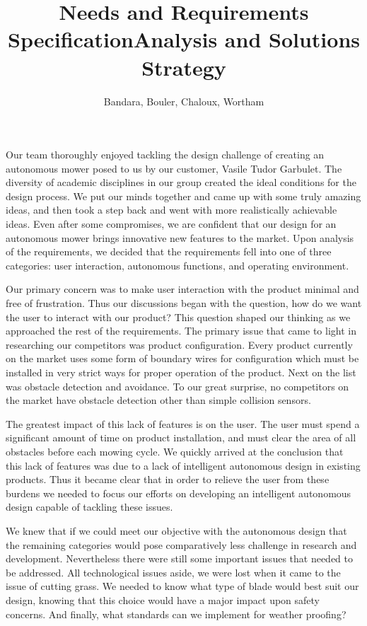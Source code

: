 \documentclass[12pt,letterpaper]{article}
\author{Bandara, Bouler, Chaloux, Wortham}
\title{Needs and Requirements Specification}
\title{Analysis and Solutions Strategy}
\begin{document}
\reqstitlepage
{}
\setcounter{page}{1}

Our team thoroughly enjoyed tackling the design challenge of creating an autonomous mower posed to us by our customer, Vasile Tudor Garbulet. The diversity of academic disciplines in our group created the ideal conditions for the design process.  We put our minds together and came up with some truly amazing ideas, and then took a step back and went with more realistically achievable ideas.  Even after some compromises, we are confident that our design for an autonomous mower brings innovative new features to the market.  Upon analysis of the requirements, we decided that the requirements fell into one of three categories:  user interaction, autonomous functions, and operating environment.

Our primary concern was to make user interaction with the product minimal and free of frustration.  Thus our discussions began with the question, how do we want the user to interact with our product?  This question shaped our thinking as we approached the rest of the requirements.  The primary issue that came to light in researching our competitors was product configuration.  Every product currently on the market uses some form of boundary wires for configuration which must be installed in very strict ways for proper operation of the product.  Next on the list was obstacle detection and avoidance.  To our great surprise, no competitors on the market have obstacle detection other than simple collision sensors.  

The greatest impact of this lack of features is on the user.  The user must spend a significant amount of time on product installation, and must clear the area of all obstacles before each mowing cycle.  We quickly arrived at the conclusion that this lack of features was due to a lack of intelligent autonomous design in existing products.  Thus it became clear that in order to relieve the user from these burdens we needed to focus our efforts on developing an intelligent autonomous design capable of tackling these issues. 

We knew that if we could meet our objective with the autonomous design that the remaining categories would pose comparatively less challenge in research and development.  Nevertheless there were still some important issues that needed to be addressed. All technological issues aside, we were lost when it came to the issue of cutting grass.  We needed to know what type of blade would best suit our design, knowing that this choice would have a major impact upon safety concerns.  And finally, what standards can we implement for weather proofing? 
\end{document}
